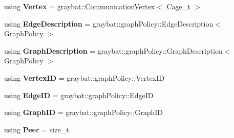 \begin{DoxyCompactItemize}
\item 
\hypertarget{structgraybat_1_1Cage_acfd9a202873f8a3d1cc5680bc2ac9267}{}using {\bfseries Vertex} = \hyperlink{structgraybat_1_1CommunicationVertex}{graybat\+::\+Communication\+Vertex}$<$ \hyperlink{structgraybat_1_1Cage}{Cage\+\_\+t} $>$\label{structgraybat_1_1Cage_acfd9a202873f8a3d1cc5680bc2ac9267}

\item 
\hypertarget{structgraybat_1_1Cage_ae6c3a8d91a9e19c48b760216646b07e3}{}using {\bfseries Edge\+Description} = graybat\+::graph\+Policy\+::\+Edge\+Description$<$ Graph\+Policy $>$\label{structgraybat_1_1Cage_ae6c3a8d91a9e19c48b760216646b07e3}

\item 
\hypertarget{structgraybat_1_1Cage_a8dcd6874d2fbb5a2a731f197aedcb87f}{}using {\bfseries Graph\+Description} = graybat\+::graph\+Policy\+::\+Graph\+Description$<$ Graph\+Policy $>$\label{structgraybat_1_1Cage_a8dcd6874d2fbb5a2a731f197aedcb87f}

\item 
\hypertarget{structgraybat_1_1Cage_ad1ae456d67c2804c63a3d651096ec2c8}{}using {\bfseries Vertex\+I\+D} = graybat\+::graph\+Policy\+::\+Vertex\+I\+D\label{structgraybat_1_1Cage_ad1ae456d67c2804c63a3d651096ec2c8}

\item 
\hypertarget{structgraybat_1_1Cage_af7f17dd2b92c84abe4b9d49b2ae6f475}{}using {\bfseries Edge\+I\+D} = graybat\+::graph\+Policy\+::\+Edge\+I\+D\label{structgraybat_1_1Cage_af7f17dd2b92c84abe4b9d49b2ae6f475}

\item 
\hypertarget{structgraybat_1_1Cage_af763549ebaa29f10a5c72246c81a8c5d}{}using {\bfseries Graph\+I\+D} = graybat\+::graph\+Policy\+::\+Graph\+I\+D\label{structgraybat_1_1Cage_af763549ebaa29f10a5c72246c81a8c5d}

\item 
\hypertarget{structgraybat_1_1Cage_abcd2ec48a85543b8521fd85ed7dd1927}{}using {\bfseries Peer} = size\+\_\+t\label{structgraybat_1_1Cage_abcd2ec48a85543b8521fd85ed7dd1927}

\end{DoxyCompactItemize}
